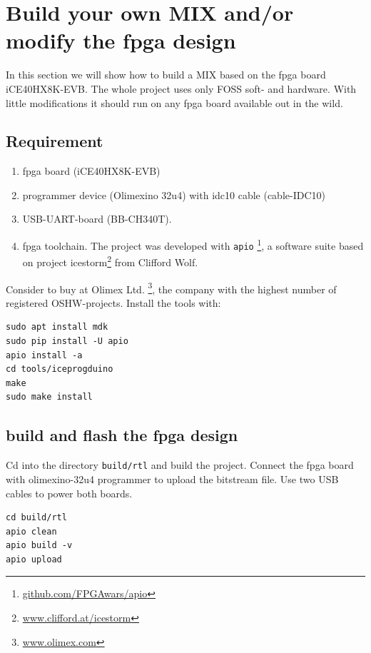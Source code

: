 \documentclass[a4paper,ngerman]{scrartcl}
\begin{document}
\section{Build your own MIX and/or modify the fpga design}

In this section we will show how to build a MIX based on the fpga board iCE40HX8K-EVB. The whole project uses only FOSS soft- and hardware. With little modifications it should run on any fpga board available out in the wild.

\subsection{Requirement}
\begin{enumerate}
	\item 
	fpga board (iCE40HX8K-EVB)
	\item programmer device (Olimexino 32u4) with idc10 cable (cable-IDC10)
	\item USB-UART-board (BB-CH340T).  
	\item fpga toolchain. The project was developed with \lstinline|apio| \footnote{\href{github.com/FPGAwars/apio}{github.com/FPGAwars/apio}}, a software suite based on project icestorm\footnote{\href{www.clifford.at/icestorm}{www.clifford.at/icestorm}} from Clifford Wolf.
\end{enumerate}

Consider to buy at Olimex Ltd. \footnote{\href{www.olimex.com}{www.olimex.com}}, the company with the highest number of registered OSHW-projects. Install the tools with:

\begin{lstlisting}[numbers=none,frame=none]
sudo apt install mdk
sudo pip install -U apio
apio install -a
cd tools/iceprogduino
make
sudo make install
\end{lstlisting}

\subsection{build and flash the fpga design}

Cd into the directory \lstinline|build/rtl| and build the project. Connect the fpga board with olimexino-32u4 programmer to upload the bitstream file. Use two USB cables to power both boards.

\begin{lstlisting}[numbers=none,frame=none]
cd build/rtl
apio clean
apio build -v
apio upload
\end{lstlisting}
\end{document}
